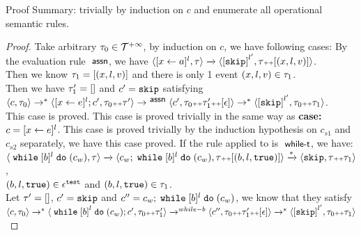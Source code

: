 Proof Summary: trivially by induction on $c$ and enumerate all operational semantic rules.
\begin{proof}
	Take arbitrary $\mathtt{\tau}_0 \in \mathcal{T}^{+\infty}$, by induction on $c$, we have following cases:
		By the evaluation rule $\textsf{\small{ assn}}$, we have
		$
		{
		\config{[\assign{{x}}{\aexpr}]^{l},  \trace } 
		\xrightarrow{} 
		\config{ \clabel{\eskip}^{l'}, \trace \tracecat [({x}, l, v) ]}
		}$.
		\\
		Then we know $\mathtt{\tau}_1 = [({x}, l, v)]$ and there is only 1 event $(x, l, v) \in \mathtt{\tau}_1$.
		\\
		Then we have $\mathtt{\tau}_1' = []$ and $c' = \mathtt{skip}$ satisfying
		\\
		$\config{c, \trace_0} \rightarrow^* \config{ [\assign{x}{\expr}]^l;c', \trace_0  \tracecat  \trace'} \rightarrow^\rname{assn}
		\config{c', \trace_0 \tracecat \trace_1'\tracecat [\event]} \rightarrow^{*}
		\config{ \clabel{\eskip}^{l'}, \trace_0  \tracecat  \trace_1}$.
		\\
		This case is proved.
		This case is proved trivially in the same way as \textbf{case: $c = [\mathrel{ x \leftarrow e }]^l$}.
		This case is proved trivially by the induction hypothesis on $c_{s1}$ and $c_{s2}$ separately, we have this case proved.
		If the rule applied to is $\textsf{\small{ while-t}}$, we have:
		\\
		$\langle {\;\ensuremath{\mathtt{while}}\;[b]^{l} \;\ensuremath{\mathtt{do}}\;(c_w), \ensuremath{\mathtt{\tau}}} \rangle
			\xrightarrow{} 
			\langle {
			c_w; \;\ensuremath{\mathtt{while}}\;[b]^{l} \;\ensuremath{\mathtt{do}}\;(c_w),
			\ensuremath{\mathtt{\tau}}{\scriptscriptstyle ++}[(b, l, \ensuremath{\mathtt{true}})]} \rangle
			\xrightarrow{*} 
			\langle {
			\ensuremath{\mathtt{skip}},
			\ensuremath{\mathtt{\tau}}{\scriptscriptstyle ++}\ensuremath{\mathtt{\tau}}_1} \rangle
		$,
		\\
		$(b, l, \mathtt{true}) \in \mathtt{\epsilon}^{\mathtt{{test}}}$ and $(b, l, \mathtt{true}) \in \mathtt{\tau}_1$.
		\\
		Let $\mathtt{\tau}' = []$, $c' = \mathtt{skip}$ and $c'' = c_w; \;\mathtt{while}\; [b]^{l} \;\mathtt{do}\; (c_w)$, we know that they satisfy
		\\
		$\config{c, \trace_0} \rightarrow^* \config{ \ewhile \clabel{b}^l \edo (c_w);c', \trace_0 \tracecat  \trace_1'} \rightarrow^{while-b}
		\config{c'', \trace_0 \tracecat \trace_1'\tracecat [\event] } \rightarrow^{*}
		\config{ \clabel{\eskip}^{l'}, \trace_0  \tracecat \trace_1}$
		\\

\end{proof}
